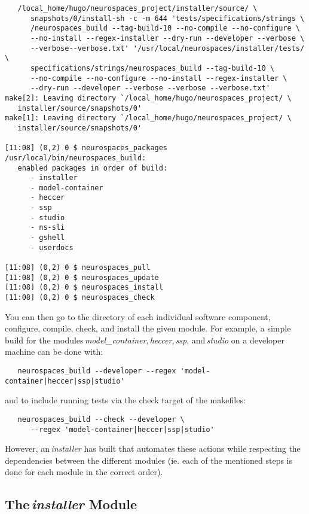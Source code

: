 \documentclass[12pt]{article}
\begin{document}
\begin{itemize}
\begin{enumerate}
\begin{verbatim}
   /local_home/hugo/neurospaces_project/installer/source/ \
      snapshots/0/install-sh -c -m 644 'tests/specifications/strings \
      /neurospaces_build --tag-build-10 --no-compile --no-configure \
      --no-install --regex-installer --dry-run --developer --verbose \
      --verbose--verbose.txt' '/usr/local/neurospaces/installer/tests/ \
      specifications/strings/neurospaces_build --tag-build-10 \
      --no-compile --no-configure --no-install --regex-installer \
      --dry-run --developer --verbose --verbose --verbose.txt'
make[2]: Leaving directory `/local_home/hugo/neurospaces_project/ \
   installer/source/snapshots/0'
make[1]: Leaving directory `/local_home/hugo/neurospaces_project/ \
   installer/source/snapshots/0'

[11:08] (0,2) 0 $ neurospaces_packages
/usr/local/bin/neurospaces_build:
   enabled packages in order of build:
      - installer
      - model-container
      - heccer
      - ssp
      - studio
      - ns-sli
      - gshell
      - userdocs

[11:08] (0,2) 0 $ neurospaces_pull
[11:08] (0,2) 0 $ neurospaces_update
[11:08] (0,2) 0 $ neurospaces_install
[11:08] (0,2) 0 $ neurospaces_check
\end{verbatim}
\end{enumerate}
\end{itemize}

You can then go to the directory of each individual software component, configure, compile, check, and install the given module. For example, a simple build for the modules\,{\it model\_container},\,{\it heccer},\,{\it ssp}, and\,{\it studio} on a developer machine can be done with:  
\begin{verbatim}
   neurospaces_build --developer --regex 'model-container|heccer|ssp|studio'
\end{verbatim}
and to include running tests via the check target of the makefiles:
\begin{verbatim}
   neurospaces_build --check --developer \
      --regex 'model-container|heccer|ssp|studio'
\end{verbatim}
However, an\,{\it installer} has built that automates these actions while respecting the dependencies between the different modules (ie. each of the mentioned steps is done for each module in the correct order).

\subsection*{The\,{\it installer} Module}
\end{document}
